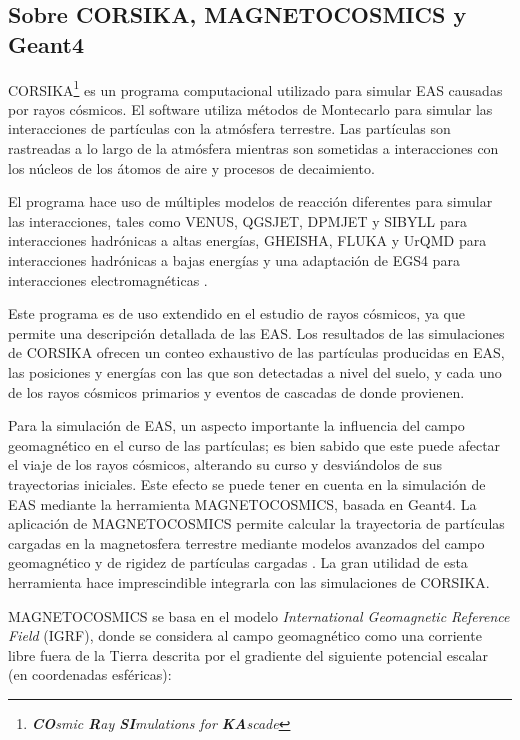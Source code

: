\documentclass[12pt]{report}
\begin{document}

\subsection*{Sobre CORSIKA, MAGNETOCOSMICS y Geant4}

CORSIKA\footnote{\textit{\textbf{CO}smic \textbf{R}ay \textbf{SI}mulations for \textbf{KA}scade}} es un programa computacional utilizado para simular EAS causadas por rayos cósmicos. El software utiliza métodos de Montecarlo para simular las interacciones de partículas con la atmósfera terrestre. Las partículas son rastreadas a lo largo de la atmósfera mientras son sometidas a interacciones con los núcleos de los átomos de aire y procesos de decaimiento.

El programa hace uso de múltiples modelos de reacción diferentes para simular las interacciones, tales como VENUS, QGSJET, DPMJET y SIBYLL para interacciones hadrónicas a altas energías, GHEISHA, FLUKA y UrQMD para interacciones hadrónicas a bajas energías y una adaptación de EGS4 para interacciones electromagnéticas \cite{heck1998corsika}.

Este programa es de uso extendido en el estudio de rayos cósmicos, ya que permite una descripción detallada de las EAS. Los resultados de las simulaciones de CORSIKA ofrecen un conteo exhaustivo de las partículas producidas en EAS, las posiciones y energías con las que son detectadas a nivel del suelo, y cada uno de los rayos cósmicos primarios y eventos de cascadas de donde provienen.

Para la simulación de EAS, un aspecto importante la influencia del campo geomagnético en el curso de las partículas; es bien sabido que este puede afectar el viaje de los rayos cósmicos, alterando su curso y desviándolos de sus trayectorias iniciales. Este efecto se puede tener en cuenta en la simulación de EAS mediante la herramienta MAGNETOCOSMICS, basada en Geant4. La aplicación de MAGNETOCOSMICS permite calcular la trayectoria de partículas cargadas en la magnetosfera terrestre mediante modelos avanzados del campo geomagnético y de rigidez de partículas cargadas \cite{magnetocosmics}. La gran utilidad de esta herramienta hace imprescindible integrarla con las simulaciones de CORSIKA.

MAGNETOCOSMICS se basa en el modelo \textit{International Geomagnetic Reference Field} (IGRF), donde se considera al campo geomagnético como una corriente libre fuera de la Tierra descrita por el gradiente del siguiente potencial escalar (en coordenadas esféricas):
\end{document}
